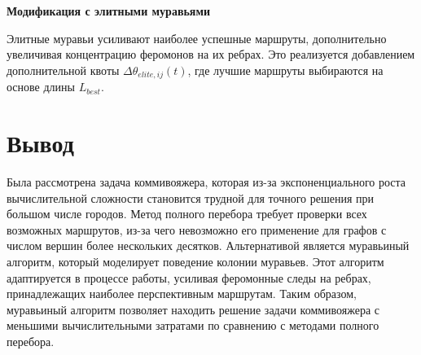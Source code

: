 \textbf{Модификация с элитными муравьями}

Элитные муравьи усиливают наиболее успешные маршруты, дополнительно увеличивая концентрацию феромонов на их ребрах. Это реализуется добавлением дополнительной квоты \(\Delta \theta_{elite,ij}(t)\), где лучшие маршруты выбираются на основе длины \(L_{best}\).

\section*{Вывод}

Была рассмотрена задача коммивояжера, которая из-за экспоненциального роста вычислительной сложности становится трудной для точного решения при большом числе городов. Метод полного перебора требует проверки всех возможных маршрутов, из-за чего невозможно его применение для графов с числом вершин более нескольких десятков.
Альтернативой является муравьиный алгоритм, который моделирует поведение колонии муравьев. Этот алгоритм адаптируется в процессе работы, усиливая феромонные следы на ребрах, принадлежащих наиболее перспективным маршрутам. Таким образом, муравьиный алгоритм позволяет находить решение задачи коммивояжера с меньшими вычислительными затратами по сравнению с методами полного перебора.

